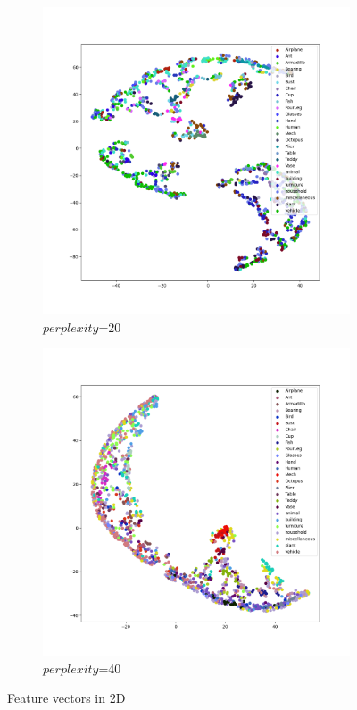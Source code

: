 \begin{figure}[H]
    \centering
    \begin{subfigure}[b]{0.55\textwidth}
         \includegraphics[width=\textwidth]{assets/evaluation_results/tsne_20.png}     
        \caption{$perplexity$=20}
        \label{fig:feature-vectors-2D-perplexity-20}
    \end{subfigure}
    \hfill
    \begin{subfigure}[b]{0.55\textwidth}
         \includegraphics[width=\textwidth]{assets/evaluation_results/tsne_40.png}
         \caption{$perplexity$=40}
         \label{fig:feature-vectors-2D-perplexity-40}
    \end{subfigure}    
    \caption{Feature vectors in 2D}
    \label{fig:feature-vectors-2D}
\end{figure}
